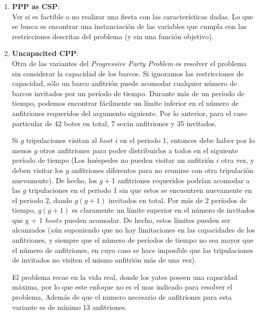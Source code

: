 \documentclass[letter, 10pt]{article}
\begin{document}
\begin{enumerate}
    \item \textbf{PPP as CSP}: \\
    Ver si es factible o no realizar una fiesta con las características dadas. Lo que se busca es encontrar una instanciación de las variables que cumpla con las restricciones descritas del problema (y sin una función objetivo). ~\cite{Brailsford:1996:OSE:241748.241755}
    
     \item \textbf{Uncapacited CPP}:\\
     Otra de las variantes del \textit{Progressive Party Problem} es resolver el problema sin considerar la capacidad de los barcos. Si ignoramos las restricciones de capacidad, sólo un barco anfitrión puede acomodar cualquier número de barcos invitados por un período de tiempo. Durante más de un período de tiempo, podemos encontrar fácilmente un límite inferior en el número de anfitriones requeridos del argumento siguiente. Por lo anterior, para el caso particular de 42 botes en total, 7 serán anfitriones y 35 invitados.
     
     Si $g$ tripulaciones visitan al $host$ $i$ en el periodo 1, entonces debe haber por lo menos $g$ otros anfitriones para poder distribuirlos a todos en el siguiente período de tiempo (Los huéspedes no pueden visitar un anfitrión $i$ otra vez, y deben visitar los $g$ anfitriones  diferentes para no reunirse con otra tripulación nuevamente). De hecho, los $g + 1$ anfitriones requeridos podrían acomodar a las $g$ tripulaciones en el periodo 1 sin que estos se encuentren nuevamente en el periodo 2, dando $g(g + 1)$ invitados en total.
Por más de 2 períodos de tiempo, $g (g + 1)$ es claramente un límite superior en el número de invitados que g + 1 $hosts$ pueden acomodar. De hecho, estos límites pueden ser alcanzados (aún suponiendo que no hay limitaciones en las capacidades de los anfitriones, y siempre que el número de períodos de tiempo no sea mayor que el número de anfitriones, en cuyo caso se hace imposible que las tripulaciones de invitados no visiten el mismo anfitrión más de una vez).

     El problema recae en la vida real, donde los yates poseen una capacidad máxima, por lo que este enfoque no es el mas indicado para resolver el problema, Además de que el numero necesario de anfitriones para esta variante es de mínimo 13 anfitriones. ~\cite{Smith1996}


\end{enumerate}
\end{document}
